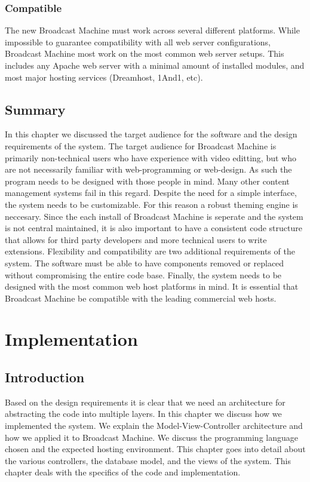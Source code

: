 \documentclass[a4paper,12pt]{report}
\begin{document}
\subsection{Compatible}
The new Broadcast Machine must work across several different platforms. 
While impossible to guarantee compatibility with all web server configurations, Broadcast Machine most work on the most common web server setups. 
This includes any Apache web server with a minimal amount of installed modules, and most major hosting services (Dreamhost, 1And1, etc). 

\section{Summary}
In this chapter we discussed the target audience for the software and the design requirements of the system. The target audience for 
Broadcast Machine is primarily non-technical users who have experience with 
video editting, but who are not 
necessarily familiar with web-programming or web-design. As such the program needs to be designed with those people in mind.
Many other content management systems fail in this regard. Despite the need for a simple interface, the system needs to be 
customizable. For this reason a robust theming engine is neccesary. Since the each install of Broadcast Machine is seperate and the system 
is not central maintained, it is also important 
to have a consistent code structure that allows for third party developers and more technical users to write extensions. 
Flexibility and compatibility are two additional requirements of the system. The software must be able to 
have components removed or 
replaced without compromising the entire code base. Finally, the system needs to be designed with the most common web host platforms in 
mind. It is essential that Broadcast Machine be compatible with the leading commercial web hosts.

\chapter{Implementation}

\section{Introduction}
Based on the design requirements it is clear that we need an architecture for abstracting the code into multiple layers. In this chapter 
we discuss how we implemented the system. We explain the Model-View-Controller architecture and how we applied it to 
Broadcast Machine. We discuss the programming language chosen and the expected hosting environment. This chapter goes into detail about 
the various controllers, the database model, and the views of the system. This chapter deals with the specifics of the code and 
implementation. 
\end{document}
